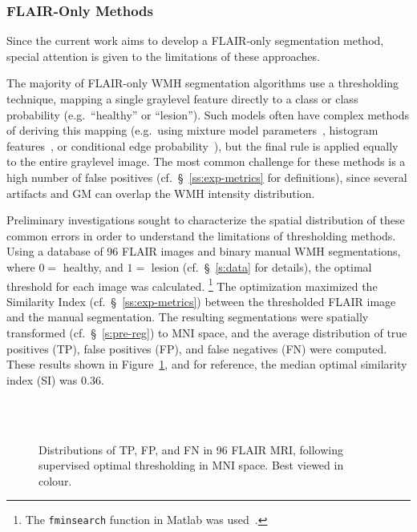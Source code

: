 \subsubsection{FLAIR-Only Methods}\label{sss:limits-flair}
Since the current work aims to develop a FLAIR-only segmentation method,
special attention is given to the limitations of these approaches.
\par
The majority of FLAIR-only WMH segmentation algorithms use a thresholding technique,
mapping a single graylevel feature directly to a class or class probability
(e.g.\ ``healthy'' or ``lesion'').
Such models often have complex methods of deriving this mapping (e.g.\
using mixture model parameters~\cite{Roura2015},
histogram features~\cite{Yoo2014},
or conditional edge probability~\cite{Knight2016}),
but the final rule is applied equally to the entire graylevel image.
The most common challenge for these methods is a high number of false positives
(cf.~\S~\ref{ss:exp-metrics} for definitions),
since several artifacts and GM can overlap the WMH intensity distribution.
\par
Preliminary investigations sought to characterize the spatial distribution of these common errors
in order to understand the limitations of thresholding methods.
Using a database of 96 FLAIR images and binary manual WMH segmentations,
where $0 =$ healthy, and $1 =$ lesion
(cf.~\S~\ref{s:data} for details),
the optimal threshold for each image was calculated.%
\footnote{The \texttt{fminsearch} function in Matlab was used~\cite{Lagarias1998}.}
The optimization maximized the Similarity Index (cf.~\S~\ref{ss:exp-metrics})
between the thresholded FLAIR image and the manual segmentation.
The resulting segmentations were spatially transformed (cf.~\S~\ref{s:pre-reg})
to MNI space, and the average distribution of
true positives (TP), false positives (FP), and false negatives (FN)
were computed.
These results shown in Figure~\ref{fig:tpfpfn-thropt},
and for reference, the median optimal similarity index (SI) was 0.36.
\begin{figure}
  \centering
  \\[0.5em]
  \\[0.5em]
  \caption{Distributions of TP, FP, and FN in 96 FLAIR MRI,
    following supervised optimal thresholding in MNI space.
    Best viewed in colour.}%
  \label{fig:tpfpfn-thropt}
\end{figure}
